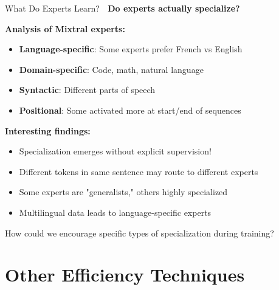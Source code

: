 \documentclass[aspectratio=169]{beamer}
\begin{document}
\begin{frame}[shrink=10]{What Do Experts Learn? 🔬}
\textbf{Do experts actually specialize?}

\vspace{0.5em}

\textbf{Analysis of Mixtral experts:}

\begin{itemize}\setlength{\itemsep}{0pt}
    \item \textbf{Language-specific}: Some experts prefer French vs English
    \item \textbf{Domain-specific}: Code, math, natural language
    \item \textbf{Syntactic}: Different parts of speech
    \item \textbf{Positional}: Some activated more at start/end of sequences
\end{itemize}

\vspace{0.5em}

\textbf{Interesting findings:}
\begin{itemize}\setlength{\itemsep}{0pt}
    \item Specialization emerges without explicit supervision!
    \item Different tokens in same sentence may route to different experts
    \item Some experts are "generalists," others highly specialized
    \item Multilingual data leads to language-specific experts
\end{itemize}

\vspace{0.5em}

\begin{discussionbox}
How could we encourage specific types of specialization during training?
\end{discussionbox}
\end{frame}

\section{Other Efficiency Techniques}
\end{document}

